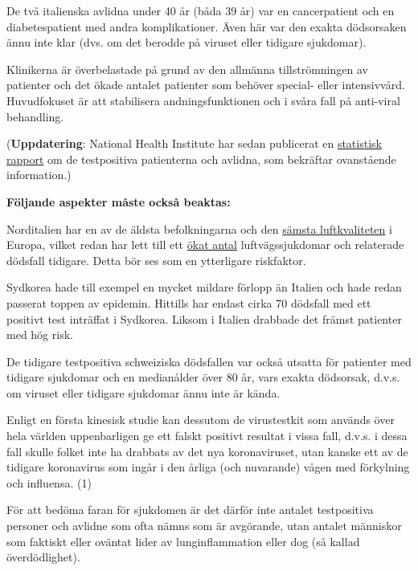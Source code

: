 De två italienska avlidna under 40 år (båda 39 år) var en cancerpatient
och en diabetespatient med andra komplikationer. Även här var den exakta
dödsorsaken ännu inte klar (dvs. om det berodde på viruset eller
tidigare sjukdomar).

Klinikerna är överbelastade på grund av den allmänna tillströmningen av
patienter och det ökade antalet patienter som behöver special- eller
intensivvård. Huvudfokuset är att stabilisera andningsfunktionen och i
svåra fall på anti-viral behandling.

(\textbf{Uppdatering}: National Health Institute har sedan publicerat en
\href{https://www.epicentro.iss.it/coronavirus/bollettino/Report-COVID-2019_17_marzo-v2.pdf}{statistisk
rapport} om de testpositiva patienterna och avlidna, som bekräftar
ovanstående information.)

\textbf{Följande aspekter måste också beaktas:}

Norditalien har en av de äldsta befolkningarna och den
\href{https://twitter.com/esa/status/1238480433047916545}{sämsta
luftkvaliteten} i Europa, vilket redan har lett till ett
\href{https://www.srf.ch/news/international/massive-schadstoffbelastung-nirgendwo-erkranken-so-viele-wegen-smog-wie-in-norditalien}{ökat
antal} luftvägssjukdomar och relaterade dödsfall tidigare. Detta bör ses
som en ytterligare riskfaktor.

Sydkorea hade till exempel en mycket mildare förlopp än Italien och hade
redan passerat toppen av epidemin. Hittills har endast cirka 70 dödsfall
med ett positivt test inträffat i Sydkorea. Liksom i Italien drabbade
det främst patienter med hög risk.

De tidigare testpositiva schweiziska dödsfallen var också utsatta för
patienter med tidigare sjukdomar och en medianålder över 80 år, vars
exakta dödsorsak, d.v.s. om viruset eller tidigare sjukdomar ännu inte
är kända.

Enligt en första kinesisk studie kan dessutom de virustestkit som
används över hela världen uppenbarligen ge ett falskt positivt resultat
i vissa fall, d.v.s. i dessa fall skulle folket inte ha drabbats av det
nya koronaviruset, utan kanske ett av de tidigare koronavirus som ingår
i den årliga (och nuvarande) vågen med förkylning och influensa. (1)

För att bedöma faran för sjukdomen är det därför inte antalet
testpositiva personer och avlidne som ofta nämns som är avgörande, utan
antalet människor som faktiskt eller oväntat lider av lunginflammation
eller dog (så kallad överdödlighet).

